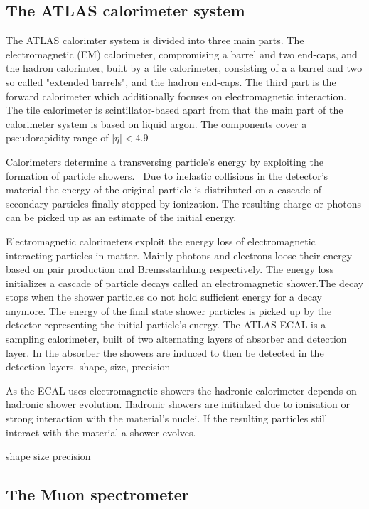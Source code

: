 \subsection{The ATLAS calorimeter system}

The ATLAS calorimter system is divided into three main parts. The electromagnetic (EM) calorimeter, compromising a barrel and two end-caps, and the hadron calorimter, built by a tile calorimeter, consisting of a a barrel and two so called "extended barrels", and the hadron end-caps. The third part is the forward calorimeter which additionally focuses on electromagnetic interaction. The tile calorimeter is scintillator-based apart from that the main part of the calorimeter system is based on liquid argon. The components cover a pseudorapidity range of $|\eta| < 4.9$

Calorimeters determine a transversing particle's energy by exploiting the formation of particle showers.~\cite{wermes} Due to inelastic collisions in the detector's material the energy of the original particle is distributed on a cascade of secondary particles finally stopped by ionization. The resulting charge or photons can be picked up as an estimate of the initial energy.

Electromagnetic calorimeters exploit the energy loss of electromagnetic interacting particles in matter. Mainly photons and electrons loose their energy based on pair production and Bremsstarhlung respectively. The energy loss initializes a cascade of particle decays called an electromagnetic shower.The decay stops when the shower particles do not hold sufficient energy for a decay anymore. The energy of the final state shower particles is picked up by the detector representing the initial particle's energy.
The ATLAS ECAL is a sampling calorimeter, built of two alternating layers of absorber and detection layer. In the absorber the showers are induced to then be detected in the detection layers.
shape, size, precision

As the ECAL uses electromagnetic showers the hadronic calorimeter depends on hadronic shower evolution. Hadronic showers are initialzed due to ionisation or strong interaction with the material's nuclei. If the resulting particles still interact with the material a shower evolves.

shape size precision

\subsection{The Muon spectrometer}

